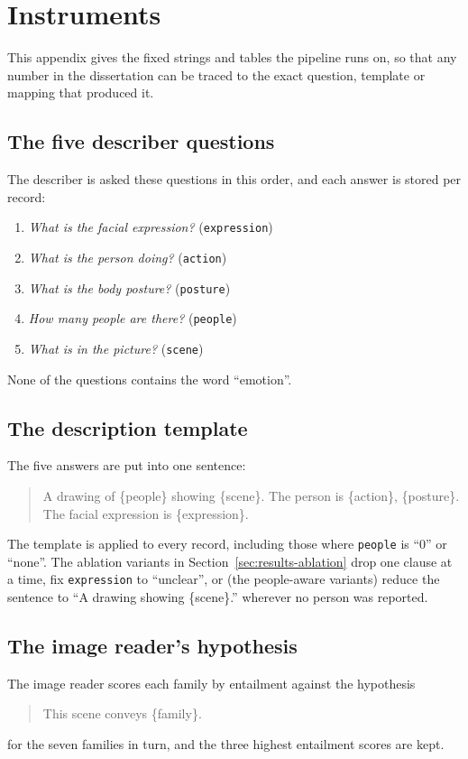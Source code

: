\chapter{Instruments}
\label{app:instruments}

This appendix gives the fixed strings and tables the pipeline runs on, so that any number in the dissertation can be traced to the exact question, template or mapping that produced it.

\section{The five describer questions}
The describer is asked these questions in this order, and each answer is stored per record:
\begin{enumerate}\setlength{\itemsep}{1pt}
\item \emph{What is the facial expression?} (\texttt{expression})
\item \emph{What is the person doing?} (\texttt{action})
\item \emph{What is the body posture?} (\texttt{posture})
\item \emph{How many people are there?} (\texttt{people})
\item \emph{What is in the picture?} (\texttt{scene})
\end{enumerate}
None of the questions contains the word ``emotion''.

\section{The description template}
The five answers are put into one sentence:
\begin{quote}\ttfamily
A drawing of \{people\} showing \{scene\}. The person is \{action\}, \{posture\}. The facial expression is \{expression\}.
\end{quote}
The template is applied to every record, including those where \texttt{people} is ``0'' or ``none''. The ablation variants in Section~\ref{sec:results-ablation} drop one clause at a time, fix \texttt{expression} to ``unclear'', or (the people-aware variants) reduce the sentence to ``A drawing showing \{scene\}.'' wherever no person was reported.

\section{The image reader's hypothesis}
The image reader scores each family by entailment against the hypothesis
\begin{quote}\ttfamily
This scene conveys \{family\}.
\end{quote}
for the seven families in turn, and the three highest entailment scores are kept.

